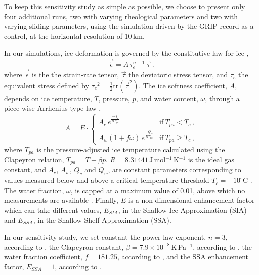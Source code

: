 To keep this sensitivity study as simple as possible, we choose to present only
four additional runs, two with varying rheological parameters and two with
varying sliding parameters, using the simulation driven by the GRIP record as
a control, at the horizontal resolution of 10\,km.

In our simulations, ice deformation is governed by the constitutive law for ice
\citep{Glen.1952, Nye.1953},
%
\begin{equation}
    \label{eqn:glenslaw}
    \vec{\dot{\epsilon}} = A\,\tau_e^{n-1}\,\vec{\tau} \,.
\end{equation}
%
where $\vec{\dot{\epsilon}}$ is the the strain-rate tensor, $\vec{\tau}$ the
deviatoric stress tensor, and $\tau_e$ the equivalent stress defined by
${\tau_e}^2 = \frac{1}{2} \mathrm{tr}(\vec{\tau}^2)$.
The ice softness coefficient, $A$, depends on ice temperature, $T$, pressure, $p$, and
water content, $\omega$, through a piece-wise Arrhenius-type law
\citep[Eqs.~63--65]{Aschwanden.etal.2012},
%
\begin{equation}
    \label{eqn:softness}
    A = E\cdot
    \begin{cases}
        A_c \,e^\frac{-Q_c}{RT_{pa}}
            & \text{if}\ T_{pa} < T_c \,, \\
        A_w (1+f\omega)\,e^\frac{-Q_w}{RT_{pa}}
            & \text{if}\ T_{pa} \ge T_c \,,
    \end{cases}
\end{equation}
%
where $T_{pa}$ is the pressure-adjusted ice temperature calculated using the
Clapeyron relation, ${T_{pa} = T - \beta p}$.
$R=8.31441$\,J\,mol$^{-1}$\,K$^{-1}$ is the ideal gas constant, and $A_c$,
$A_w$, $Q_c$ and $Q_w$, are constant parameters corresponding to values
measured below and above a critical temperature threshold ${T_c=-10}^\circ$C
\citep[p.~72]{Paterson.Budd.1982,Cuffey.Paterson.2010}. The water fraction,
$\omega$, is capped at a maximum value of 0.01, above which no measurements
are available \citep[Eq.~5.7]{Lliboutry.Duval.1985, Greve.1997}. Finally,
$E$ is a non-dimensional enhancement factor which can take different values,
$E_{SIA}$, in the Shallow Ice Approximation (SIA) and $E_{SSA}$, in the Shallow
Shelf Approximation (SSA).

In our sensitivity study, we set constant the power-law exponent, $n=3$,
according to \citet[p.~55--57]{Cuffey.Paterson.2010}, the Clapeyron constant,
$\beta=7.9\times 10^{-8}$\,K\,Pa$^{-1}$, according to \citep{Luthi.etal.2002},
the water fraction coefficient, $f=181.25$, according to
\citet{Lliboutry.Duval.1985}, and the SSA enhancement factor, $E_{SSA}=1$,
according to \citet[p.~77]{Cuffey.Paterson.2010}.

